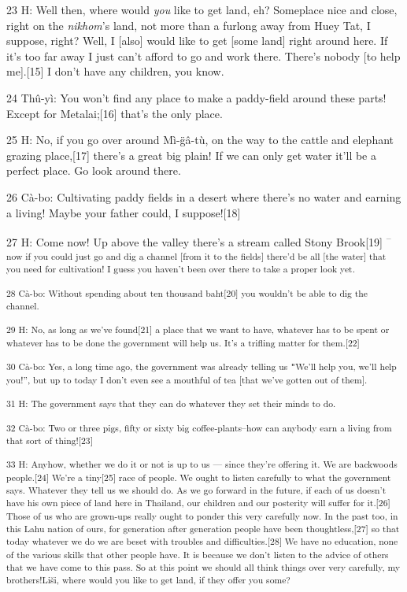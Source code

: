 {23 H: Well then, where would }{\textit{you}}{ like to get
land, eh? Someplace nice and close, right on the }{\textit{nikhom}}{'s
land, not more than a furlong away from Huey Tat, I suppose, right? Well, I [also]
would like to get [some land] right around here. If it's too far away I just can't
afford to go and work there. There's nobody [to help me].[15] I don't have any
children, you know.}

{24 Thû-yì: You won't find any place to make a paddy-field around these
parts! Except for Metalai;[16] that's the only place.}

{25 H: No, if you go over around Mì-g̈â-tù, on the way to the cattle
and elephant grazing place,[17] there's a great big plain! If we can only get water
it'll be a perfect place. Go look around there. }

{26 Cà-bo: Cultivating paddy fields in a desert where there's no water
and earning a living! Maybe your father could, I suppose![18]}

{27 H: Come now! Up above the valley there's a stream called Stony Brook[19]}{\textsuperscript{
-- now if you could just go and dig a channel [from it to the fields] there'd be
all [the water] that you need for cultivation! I guess you haven't been over there
to take a proper look yet. }}

{\textsuperscript{28 Cà-bo: Without spending about ten thousand baht[20]
you wouldn't be able to dig the channel. }}

{\textsuperscript{29 H: No, as long as we've found[21] a place that we want
to have, whatever has to be spent or whatever has to be done the government will
help us. It's a trifling matter for them.[22]}}

{\textsuperscript{30 Cà-bo: Yes, a long time ago, the government was already
telling us \texttt{"}We'll help you, we'll help you!'', but up to today I don't
even see a mouthful of tea [that we've gotten out of them].}}

{\textsuperscript{31 H: The government says that they can do whatever they
set their minds to do. }}

{\textsuperscript{32 Cà-bo: Two or three pigs, fifty or sixty big coffee-plants--how
can anybody earn a living from that sort of thing![23]}}

{\textsuperscript{33 H: Anyhow, whether we do it or not is up to us ---
since they're offering it. We are backwoods people.[24] We're a tiny[25] race of
people. We ought to listen carefully to what the government says. Whatever they
tell us we should do. As we go forward in the future, if each of us doesn't have
his own piece of land here in Thailand, our children and our posterity will suffer
for it.[26] Those of us who are grown-ups really ought to ponder this very carefully
now. In the past too, in this Lahu nation of ours, for generation after generation
people have been thoughtless,[27] so that today whatever we do we are beset with
troubles and difficulties.[28] We have no education, none of the various skills
that other people have. It is because we don't listen to the advice of others that
we have come to this pass. So at this point we should all think things over very
carefully, my brothers!Liši, where would you like to get land, if they offer you
some?}}


